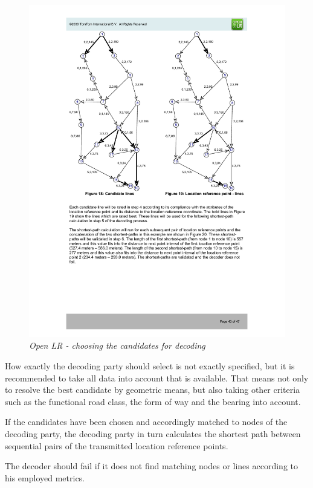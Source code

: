 \begin{figure}
  \includegraphics{fig/openlr-decoding-1.pdf}%
  \caption{\emph{Open LR - choosing the candidates for decoding}}%
  \label{fig:openlr-decoding-1}%
\end{figure}

How exactly the decoding party should select is not exactly specified, but it is recommended to take all data into account that is available. That means not only to resolve the best candidate by geometric means, but also taking other criteria such as the functional road class, the form of way and the bearing into account.

If the candidates have been chosen and accordingly matched to nodes of the decoding party, the decoding party in turn calculates the shortest path between sequential pairs of the transmitted location reference points.

The decoder should fail if it does not find matching nodes or lines according to his employed metrics.

